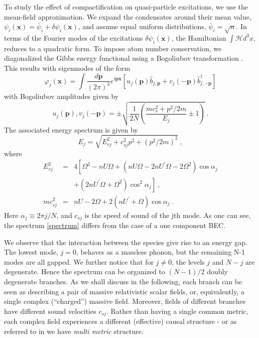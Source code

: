 \documentclass[aps,prl,twocolumn,unsortedaddress,superscriptaddress]{revtex4-1}
\newcommand{\cop}[2]{\hat{#1}^\dagger_{#2}}
\newcommand{\aop}[2]{\hat{#1}_{#2}}
\newcommand{\p}{\mathbf{p}}
\newcommand{\x}{\mathbf{x}}
\begin{document}
To study the effect of compactification on quasi-particle excitations, we use the 
mean-field approximation. We expand the condensates around their mean value, $\psi_i(\x)=\bar{\psi}_i+\delta\psi_i(\x)$, and assume equal uniform distributions, $\bar{\psi}_i=\sqrt{n}$.
In terms of the Fourier modes of the excitations $\delta\psi_i(\x)$,  
the Hamiltonian $\int \mathcal{H} d^3x $, reduces to a quadratic form.
To impose atom number conservation, we diagonalized the Gibbs energy functional using a Bogoliubov transformation \cite{Pethick2002,diagonalization1}.
This results with eigenmodes of the form  
\begin{equation}\label{excitation}
\varphi_j(\x)=\int \frac{d\p}{(2\pi)^{3}} e^{i\p \x}[u_{j}(\p)\aop{b}{j,\p}+v_{j}(-\p)\cop{b}{j,-\p}]
\end{equation}
with Bogoliubov amplitudes given by 
\begin{equation}
u_j(\p),v_j(-\p)=\pm\sqrt{\frac{1}{2N}\left(\frac{mc_s^{2}+p^{2}/2m}{E_j}\pm1\right)}~.
\end{equation}
The associated  energy spectrum is given by 
\begin{equation}\label{spectrum}
E_j=\sqrt{E_{rj}^{2}+c_{sj}^{2}p^{2}+(p^{2}/2m)^{2}}~,
\end{equation}
where
\begin{eqnarray}
E_{rj}^{2}&=&4\left[\Omega^2-nU\Omega+\left(nU\Omega-2nU^{\prime}\Omega-2\Omega^2\right)\cos \alpha_j\right.\nonumber\\
&&\left.+\left(2nU^{\prime}\Omega+\Omega^2\right)\cos ^2\alpha_j\right]~,\label{mass}\\
mc^{2}_{sj}&=&nU-2\Omega+2\left(nU^{\prime}+\Omega \right) \cos \alpha_j~.\label{speed}
\end{eqnarray}
Here $\alpha_j\equiv 2\pi j/N$, and $c_{sj}$ is the speed of sound of the jth mode.
As one can see, the spectrum \eqref{spectrum} differs from the case of a one component BEC. 

We observe that the interaction between the species give rise to an energy gap.
The lowest mode, $j=0$, behaves as a massless phonon, but the remaining N-1 modes are all gapped. We further notice that for $j\neq0$,  the levels $j$ and $N-j$ are degenerate. Hence the spectrum can be organized to $(N-1)/2$ doubly degenerate branches.
As we shall discuss in the following, each branch can be seen as describing a pair of massive relativistic scalar fields, or, equivalently, a single complex (``charged'') massive field. Moreover, fields of different branches have different sound velocities $c_{sj}$.
Rather than having a single common metric, each complex field experiences a different (effective) causal structure - or as referred to in  \cite{Visser} we have \emph{multi metric} structure. 
\end{document}
